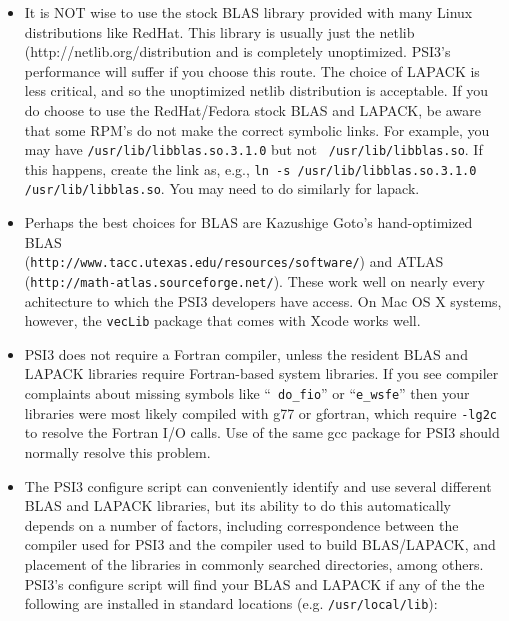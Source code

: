 \documentclass[12pt]{article}
\begin{document}
\begin{itemize}
\item It is NOT wise to use the stock BLAS library provided with many
  Linux distributions like RedHat.  This library is usually just the
  netlib ({http://netlib.org/}distribution and is completely
  unoptimized.  PSI3's performance will suffer if you choose this
  route.  The choice of LAPACK is less critical, and so the
  unoptimized netlib distribution is acceptable.  If you do choose to
  use the RedHat/Fedora stock BLAS and LAPACK, be aware that some
  RPM's do not make the correct symbolic links.  For example, you may
  have {\tt /usr/lib/libblas.so.3.1.0} but not {\tt
    /usr/lib/libblas.so}.  If this happens, create the link as, e.g.,
  {\tt ln -s /usr/lib/libblas.so.3.1.0 /usr/lib/libblas.so}.  You may
  need to do similarly for lapack.

\item Perhaps the best choices for BLAS are Kazushige Goto's
  hand-optimized BLAS \\
({\tt http://www.tacc.utexas.edu/resources/software/}) and ATLAS \\
({\tt http://math-atlas.sourceforge.net/}).  These work well on nearly
  every achitecture to which the PSI3 developers have access.  On Mac
  OS X systems, however, the {\tt vecLib} package that comes with
  Xcode works well.

\item PSI3 does not require a Fortran compiler, unless the resident
  BLAS and LAPACK libraries require Fortran-based system libraries.
  If you see compiler complaints about missing symbols like ``{\tt
    do\_fio}'' or ``{\tt e\_wsfe}'' then your libraries were most likely
  compiled with g77 or gfortran, which require {\tt -lg2c} to resolve
  the Fortran I/O calls.  Use of the same gcc package for PSI3 should
  normally resolve this problem.

\item The PSI3 configure script can conveniently identify and use
  several different BLAS and LAPACK libraries, but its ability to do
  this automatically depends on a number of factors, including
  correspondence between the compiler used for PSI3 and the compiler
  used to build BLAS/LAPACK, and placement of the libraries in
  commonly searched directories, among others.  PSI3's configure
  script will find your BLAS and LAPACK if any of the the following
  are installed in standard locations (e.g. {\tt /usr/local/lib}):


\end{itemize}
\end{document}
